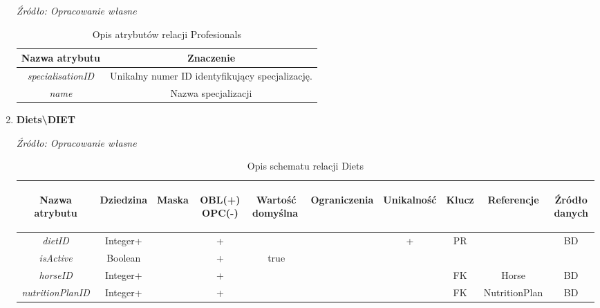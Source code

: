 \documentclass[12pt,oneside]{report}
\begin{document}
\begin{enumerate}[start=1,label={\bfseries REL\textbackslash0\arabic*}]
\begin{table}[H]
	\caption{Opis atrybutów relacji Profesionals}
	\textit{Źródło: Opracowanie własne}
	\label{SpecialisationsAttributeDescription}
	\centering
	\begin{tabular}{|c|c|}
		\hline
		Nazwa atrybutu & Znaczenie \\
		\hline
		\textit{specialisationID}& Unikalny numer ID identyfikujący specjalizację.\\
		\hline
		\textit{name}& Nazwa specjalizacji\\
		\hline
	\end{tabular}
\end{table}
\item \textbf{Diets\textbackslash DIET}
\begin{table}[H]
	\caption{Opis schematu relacji Diets}
	\textit{Źródło: Opracowanie własne}
	\label{DietsRelationSchema}
	\centering
	\begin{tabular}{|c|c|c|c|c|c|c|c|c|c|}
		\hline
		\begin{sideways}Nazwa atrybutu\end{sideways}& 
		\begin{sideways}Dziedzina \end{sideways}& 
		\begin{sideways}Maska \end{sideways}& 
		\begin{sideways}OBL(+) OPC(-)\end{sideways} & 
		\begin{sideways}Wartość domyślna$\ $\end{sideways}& 
		\begin{sideways}Ograniczenia\end{sideways} &
		\begin{sideways}Unikalność \end{sideways}& 
		\begin{sideways}Klucz \end{sideways}& 
		\begin{sideways}Referencje \end{sideways}&
		\begin{sideways}Źródło danych\end{sideways}\\
		\hline
		 \textit{dietID}&Integer+&&+&&&+&PR&&BD\\
		 \hline
		 \textit{isActive}&Boolean&&+&true&&&&&\\
		 \hline
		 \textit{horseID}&Integer+&&+&&&&FK&Horse&BD\\
		 \hline
		 \textit{nutritionPlanID}&Integer+&&+&&&&FK&NutritionPlan&BD\\
		 \hline
	\end{tabular}
\end{table}


\end{enumerate}
\end{document}
